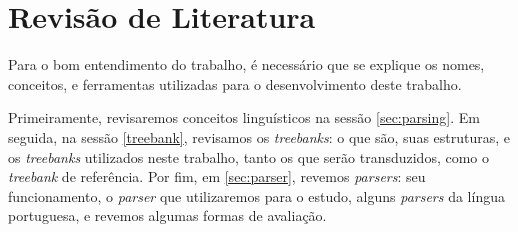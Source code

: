 
\chapter{Revisão de Literatura}

Para o bom entendimento do trabalho, é necessário que se explique os nomes, conceitos, e ferramentas utilizadas para o desenvolvimento deste trabalho.

Primeiramente, revisaremos conceitos linguísticos na sessão \ref{sec:parsing}. Em seguida, na sessão \ref{treebank}, revisamos os \textit{treebanks}: o que são, suas estruturas, e os \textit{treebanks} utilizados neste trabalho, tanto os que serão transduzidos, como o \textit{treebank} de referência. Por fim, em \ref{sec:parser}, revemos \textit{parsers}: seu funcionamento, o \textit{parser} que utilizaremos para o estudo, alguns \textit{parsers} da língua portuguesa, e revemos algumas formas de avaliação.




